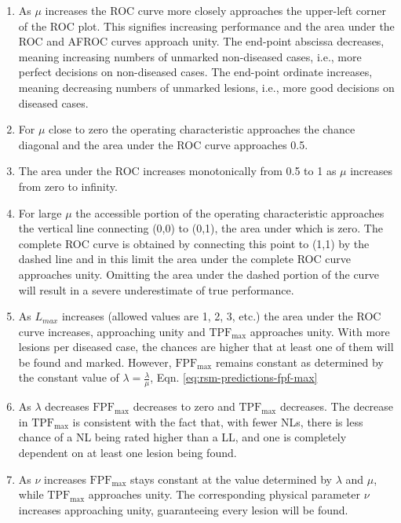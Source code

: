 \documentclass[
]{book}
\providecommand{\tightlist}{%
  \setlength{\itemsep}{0pt}\setlength{\parskip}{0pt}}
\begin{document}
\begin{enumerate}
\def\labelenumi{\arabic{enumi}.}
\tightlist
\item
  As \(\mu\) increases the ROC curve more closely approaches the upper-left corner of the ROC plot. This signifies increasing performance and the area under the ROC and AFROC curves approach unity. The end-point abscissa decreases, meaning increasing numbers of unmarked non-diseased cases, i.e., more perfect decisions on non-diseased cases. The end-point ordinate increases, meaning decreasing numbers of unmarked lesions, i.e., more good decisions on diseased cases.
\item
  For \(\mu\) close to zero the operating characteristic approaches the chance diagonal and the area under the ROC curve approaches 0.5.
\item
  The area under the ROC increases monotonically from 0.5 to 1 as \(\mu\) increases from zero to infinity.
\item
  For large \(\mu\) the accessible portion of the operating characteristic approaches the vertical line connecting (0,0) to (0,1), the area under which is zero. The complete ROC curve is obtained by connecting this point to (1,1) by the dashed line and in this limit the area under the complete ROC curve approaches unity. Omitting the area under the dashed portion of the curve will result in a severe underestimate of true performance.
\item
  As \(L_{max}\) increases (allowed values are 1, 2, 3, etc.) the area under the ROC curve increases, approaching unity and \(\text{TPF}_{\text{max}}\) approaches unity. With more lesions per diseased case, the chances are higher that at least one of them will be found and marked. However, \(\text{FPF}_{\text{max}}\) remains constant as determined by the constant value of \(\lambda = \frac{\lambda}{\mu}\), Eqn. \eqref{eq:rsm-predictions-fpf-max}
\item
  As \(\lambda\) decreases \(\text{FPF}_{\text{max}}\) decreases to zero and \(\text{TPF}_{\text{max}}\) decreases. The decrease in \(\text{TPF}_{\text{max}}\) is consistent with the fact that, with fewer NLs, there is less chance of a NL being rated higher than a LL, and one is completely dependent on at least one lesion being found.
\item
  As \(\nu\) increases \(\text{FPF}_{\text{max}}\) stays constant at the value determined by \(\lambda\) and \(\mu\), while \(\text{TPF}_{\text{max}}\) approaches unity. The corresponding physical parameter \(\nu\) increases approaching unity, guaranteeing every lesion will be found.
\end{enumerate}
\end{document}
